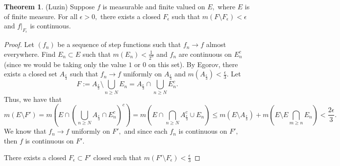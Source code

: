 \documentclass[10pt, oneside]{article}
\theoremstyle{definition}
\newtheorem{thm}{Theorem}
\begin{document}
\begin{thm}
    (Luzin) Suppose $f$ is measurable and finite valued on $E,$ where $E$ is of finite measure. For all $\epsilon >0,$ there exists a closed $F_\epsilon$ such that $m(F \setminus F_\epsilon) < \epsilon$ and $f|_{F_\epsilon}$ is continuous.
\end{thm}
\begin{proof}
    Let $(f_n)$ be a sequence of step functions such that $f_n \to f$ almost everywhere. Find $E_n \subset E$ such that $m(E_n)< \frac{1}{2^n}$ and $f_n$ are continuous on $E_n^c$ (since we would be taking only the value $1$ or $0$ on this set). By Egorov, there exists a closed set $A_\frac{\epsilon}{3}$ such that $f_n \to f$ uniformly on $A_\frac{\epsilon}{3}$ and $m(A_\frac{\epsilon}{3})< \frac{\epsilon}{3}.$
    Let 
    \[F:= A_\frac{\epsilon}{3} \setminus \bigcup_{n\geq N} E_n = A_\frac{\epsilon}{3} \cap \bigcup_{n\geq N}E_n^c.\] Thus, we have that 
    \[m(E \setminus F') = m(E \cap (\bigcup_{n\geq N}A_\frac{\epsilon}{3}\cap E_n^c)^c) = m(E \cap \bigcap_{n\geq N} A_\frac{\epsilon}{3}^c \cup E_n) \leq m(E \setminus A_\frac{\epsilon}{3}) + m(E \setminus E \bigcap_{m\geq n} E_n) < \frac{2\epsilon}{3}.\] We know that $f_n \to f$ uniformly on $F',$ and since each $f_n$ is continuous on $F',$ then $f$ is continuous on $F'.$ 

    There exists a closed $F_\epsilon\subset F'$ closed such that $m(F' \setminus F_\epsilon)< \frac{\epsilon   }{3}$ 
\end{proof}

\newpage
\end{document}
